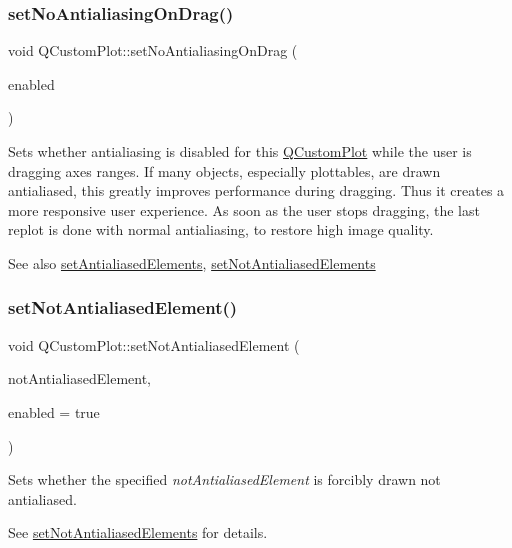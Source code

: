 \subsubsection{\texorpdfstring{set\+No\+Antialiasing\+On\+Drag()}{setNoAntialiasingOnDrag()}}
{\footnotesize\ttfamily void Q\+Custom\+Plot\+::set\+No\+Antialiasing\+On\+Drag (\begin{DoxyParamCaption}\item[{bool}]{enabled }\end{DoxyParamCaption})}

Sets whether antialiasing is disabled for this \hyperlink{classQCustomPlot}{Q\+Custom\+Plot} while the user is dragging axes ranges. If many objects, especially plottables, are drawn antialiased, this greatly improves performance during dragging. Thus it creates a more responsive user experience. As soon as the user stops dragging, the last replot is done with normal antialiasing, to restore high image quality.

\begin{DoxySeeAlso}{See also}
\hyperlink{classQCustomPlot_af6f91e5eab1be85f67c556e98c3745e8}{set\+Antialiased\+Elements}, \hyperlink{classQCustomPlot_ae10d685b5eabea2999fb8775ca173c24}{set\+Not\+Antialiased\+Elements} 
\end{DoxySeeAlso}
\mbox{\label{classQCustomPlot_afc657938a707c890e449ae89203a076d}} 
\subsubsection{\texorpdfstring{set\+Not\+Antialiased\+Element()}{setNotAntialiasedElement()}}
{\footnotesize\ttfamily void Q\+Custom\+Plot\+::set\+Not\+Antialiased\+Element (\begin{DoxyParamCaption}\item[{\hyperlink{namespaceQCP_ae55dbe315d41fe80f29ba88100843a0c}{Q\+C\+P\+::\+Antialiased\+Element}}]{not\+Antialiased\+Element,  }\item[{bool}]{enabled = {\ttfamily true} }\end{DoxyParamCaption})}

Sets whether the specified {\itshape not\+Antialiased\+Element} is forcibly drawn not antialiased.

See \hyperlink{classQCustomPlot_ae10d685b5eabea2999fb8775ca173c24}{set\+Not\+Antialiased\+Elements} for details.

